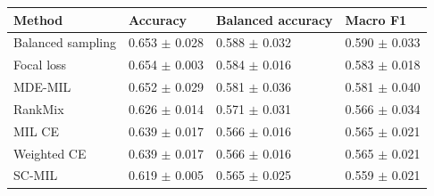 \begin{tabular}{llll}
\toprule
Method & Accuracy & Balanced accuracy & Macro F1\\
\midrule
Balanced sampling & \num{0.653} $\pm$ \num{0.028} & \num{0.588} $\pm$ \num{0.032} & \num{0.590} $\pm$ \num{0.033}\\
Focal loss & \num{0.654} $\pm$ \num{0.003} & \num{0.584} $\pm$ \num{0.016} & \num{0.583} $\pm$ \num{0.018}\\
MDE-MIL & \num{0.652} $\pm$ \num{0.029} & \num{0.581} $\pm$ \num{0.036} & \num{0.581} $\pm$ \num{0.040}\\
RankMix & \num{0.626} $\pm$ \num{0.014} & \num{0.571} $\pm$ \num{0.031} & \num{0.566} $\pm$ \num{0.034}\\
MIL CE & \num{0.639} $\pm$ \num{0.017} & \num{0.566} $\pm$ \num{0.016} & \num{0.565} $\pm$ \num{0.021}\\
Weighted CE & \num{0.639} $\pm$ \num{0.017} & \num{0.566} $\pm$ \num{0.016} & \num{0.565} $\pm$ \num{0.021}\\
SC-MIL & \num{0.619} $\pm$ \num{0.005} & \num{0.565} $\pm$ \num{0.025} & \num{0.559} $\pm$ \num{0.021}\\
\bottomrule
\end{tabular}
